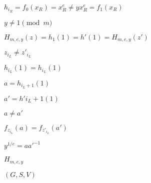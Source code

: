 \documentclass[10pt]{book}
\begin{document}
\begin{mdSnippets}
\begin{mdInlineSnippet}[8b3f3832a502bf2b4fbeafe263bf27bb]%
$h_{i_R} = f_{0}(x_R) = x_R^e \neq yx_R^e = f_1(x_R)$\end{mdInlineSnippet}%
\begin{mdInlineSnippet}[ae277ba764307d7a12b748d7a06b0f17]%
$y \neq 1 \pmod m$\end{mdInlineSnippet}%
\begin{mdInlineSnippet}[a586793e477cf0b0fde6d321141902ae]%
$H_{m,e,y}(z) = h_1(1) = h'(1) = H_{m,e,y}(z')$\end{mdInlineSnippet}%
\begin{mdInlineSnippet}[9bb5bc62f789f123b5c619ec462d1dd0]%
$z_{i_L} \neq z'_{i_L}$\end{mdInlineSnippet}%
\begin{mdInlineSnippet}[0578ba658f80892f6da2a12b95c2e36a]%
$h_{i_L}(1) = h_{i_L}(1)$\end{mdInlineSnippet}%
\begin{mdInlineSnippet}[e3724ff932dff35d73392113cc1b0bd5]%
$a = h_{i_L + 1}(1)$\end{mdInlineSnippet}%
\begin{mdInlineSnippet}%
$a' = h'{i_L + 1}(1)$\end{mdInlineSnippet}%
\begin{mdInlineSnippet}[6180e1c4b10bb90a9291436984ab098a]%
$a \neq a'$\end{mdInlineSnippet}%
\begin{mdInlineSnippet}%
$f_{z_{i_L}}(a) = f_{z'_{i_L}}(a')$\end{mdInlineSnippet}%
\begin{mdInlineSnippet}[d2f89c4d3a39a346f91c31f5114f9360]%
$y^{1/e} = aa'^{-1}$\end{mdInlineSnippet}%
\begin{mdInlineSnippet}[6c541214fedee4698e65eb32d341d9f2]%
$H_{m,e,y}$\end{mdInlineSnippet}%
\begin{mdInlineSnippet}[a5c779af54bf48c4069f801dc4099d62]%
$(G,S,V)$\end{mdInlineSnippet}%
\begin{mdInlineSnippet}[6f8f57715090da2632453988d9a1501b]%

\end{mdInlineSnippet}
\end{mdSnippets}
\end{document}

